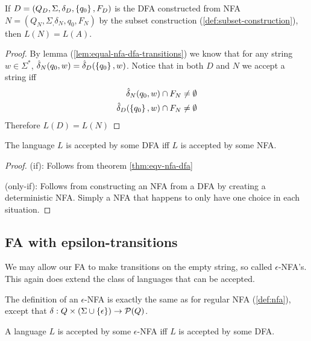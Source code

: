\begin{theorem} \label{thm:eqv-nfa-dfa}
    If $D = (Q_D, \Sigma, \delta_D, \left\{ q_0 \right\}, F_D)$ is the DFA constructed from NFA $N = (Q_N, \Sigma_, \delta_N, q_0, F_N)$ by the subset construction (\ref{def:subset-construction}), then $L(N) = L(A)$. 
\end{theorem}

\begin{proof}
    By lemma (\ref{lem:equal-nfa-dfa-transitions}) we know that for any string $w \in \Sigma^*$, $\hat\delta_N(q_0, w) = \hat\delta_D(\left\{ q_0 \right\}, w)$. Notice that in both $D$ and $N$ we accept a string iff
    \begin{align*}
        \hat\delta_N(q_0, w) \cap F_N \neq \emptyset \\
        \hat\delta_D(\left\{ q_0 \right\}, w) \cap F_N \neq \emptyset
    \end{align*}
    Therefore $L(D) = L(N)$
\end{proof}

\begin{theorem}
    The language $L$ is accepted by some DFA iff $L$ is accepted by some NFA.
\end{theorem}

\begin{proof}
    (if): Follows from theorem \ref{thm:eqv-nfa-dfa}

    (only-if): Follows from constructing an NFA from a DFA by creating a deterministic NFA. Simply a NFA that happens to only have one choice in each situation.
\end{proof}

\subsection{FA with epsilon-transitions}
We may allow our FA to make transitions on the empty string, so called $\epsilon$-NFA's. This again does extend the class of languages that can be accepted.

\begin{definition} \label{def:eps-nfa}
    The definition of an $\epsilon$-NFA is exactly the same as for regular NFA (\ref{def:nfa}), except that $\delta : Q\times(\Sigma\cup\left\{ \epsilon \right\}) \rightarrow \mathcal{P}(Q)$.
\end{definition}

\begin{theorem}
    A language $L$ is accepted by some $\epsilon$-NFA iff $L$ is accepted by some DFA.
\end{theorem}

